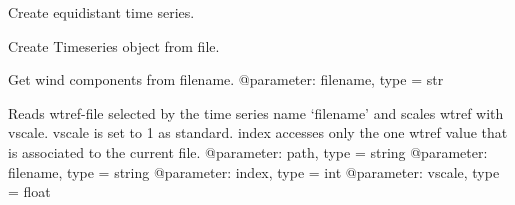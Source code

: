 \documentclass[letterpaper,10pt,english]{sphinxmanual}
\begin{document}
\begin{fulllineitems}
\begin{fulllineitems}
\end{fulllineitems}


\begin{fulllineitems}
\label{\detokenize{index:windtunnel.Timeseries_nc.equidistant}}
Create equidistant time series.

\end{fulllineitems}


\begin{fulllineitems}
\label{\detokenize{index:windtunnel.Timeseries_nc.from_file}}
Create Timeseries object from file.

\end{fulllineitems}


\begin{fulllineitems}
\label{\detokenize{index:windtunnel.Timeseries_nc.get_wind_comps}}
Get wind components from filename.
@parameter: filename, type = str

\end{fulllineitems}


\begin{fulllineitems}
\label{\detokenize{index:windtunnel.Timeseries_nc.get_wtref}}
Reads wtref-file selected by the time series name ‘filename’ and
scales wtref with vscale. vscale is set to 1 as standard. index
accesses only the one wtref value that is associated to the current
file.
@parameter: path, type = string
@parameter: filename, type = string
@parameter: index, type = int
@parameter: vscale, type = float

\end{fulllineitems}



\end{fulllineitems}
\end{document}
